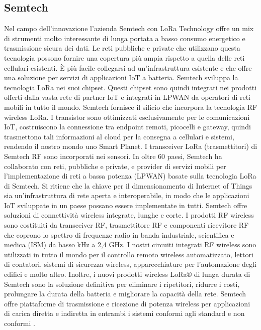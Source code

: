 \documentclass[a4paper]{report} %
\begin{document}
\subsection{Semtech}
Nel campo dell'innovazione l'azienda Semtech con LoRa Technology offre un mix di strumenti molto interessante di lunga portata a basso consumo energetico e trasmissione sicura dei dati. Le reti pubbliche e private che utilizzano questa tecnologia possono fornire una copertura più ampia rispetto a quella delle reti cellulari esistenti. È più facile collegarsi ad un'infrastruttura esistente e che offre una soluzione per servizi di applicazioni IoT a batteria. Semtech sviluppa la tecnologia LoRa nei suoi chipset. Questi chipset sono quindi integrati nei prodotti offerti dalla vasta rete di partner IoT e integrati in LPWAN da operatori di reti mobili in tutto il mondo. 
Semtech fornisce il silicio che incorpora la tecnologia RF wireless LoRa. I transistor sono ottimizzati esclusivamente per le comunicazioni IoT, costruiscono la connessione tra endpoint remoti, picocelli e gateway, quindi trasmettono tali informazioni al cloud per la consegna a cellulari e sistemi, rendendo il nostro mondo uno Smart Planet. I transceiver LoRa (trasmettitori) di Semtech RF sono incorporati nei sensori.
In oltre 60 paesi, Semtech ha collaborato con reti, pubbliche e private, e provider di servizi mobili per l'implementazione di reti a bassa potenza (LPWAN) basate sulla tecnologia LoRa di Semtech. Si ritiene che la chiave per il dimensionamento di Internet of Things sia un'infrastruttura di rete aperta e interoperabile, in modo che le applicazioni IoT sviluppate in un paese possano essere implementate in tutti. 
Semtech offre soluzioni di connettività wireless integrate, lunghe e corte. I prodotti RF wireless sono costituiti da transceiver RF, trasmettitore RF e componenti ricevitore RF che coprono lo spettro di frequenze radio in banda industriale, scientifica e medica (ISM) da basso kHz a 2,4 GHz. I nostri circuiti integrati RF wireless sono utilizzati in tutto il mondo per il controllo remoto wireless automatizzato, lettori di contatori, sistemi di sicurezza wireless, apparecchiature per l'automazione degli edifici e molto altro. Inoltre, i nuovi prodotti wireless LoRa® di lunga durata di Semtech sono la soluzione definitiva per eliminare i ripetitori, ridurre i costi, prolungare la durata della batteria e migliorare la capacità della rete. Semtech offre piattaforme di trasmissione e ricezione di potenza wireless per applicazioni di carica diretta e indiretta in entrambi i sistemi conformi agli standard e non conformi \cite{art:rif.24}. 
\end{document}
